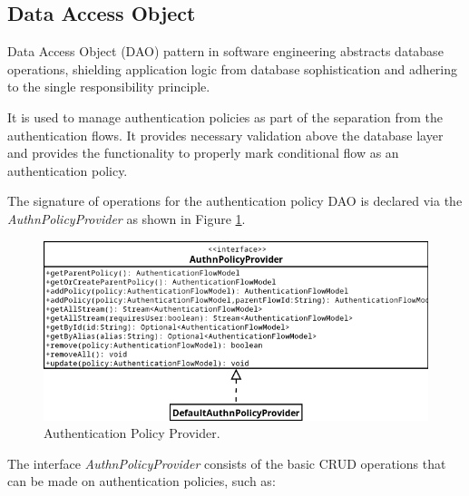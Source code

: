 \subsection{Data Access Object} \label{impl-authn-policies-dao}
Data Access Object (DAO) pattern in software engineering abstracts database operations, shielding application logic from database sophistication and adhering to the single responsibility principle.\cite{impl-dao}

It is used to manage authentication policies as part of the separation from the authentication flows.
It provides necessary validation above the database layer and provides the functionality to properly mark conditional flow as an authentication policy.

The signature of operations for the authentication policy DAO is declared via the \textit{AuthnPolicyProvider} as shown in Figure \ref{fig:impl-authn-policies-provider-diagram}.

\begin{figure}[htbp]
  \centering
  \includegraphics[width=1\textwidth]{img/sections/6-implementation/authn-policy-provider-diagram.png}
  \caption{Authentication Policy Provider.}
  \label{fig:impl-authn-policies-provider-diagram}
\end{figure}

\newpage

The interface \textit{AuthnPolicyProvider} consists of the basic CRUD operations that can be made on authentication policies, such as:

